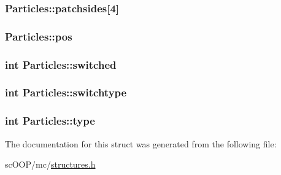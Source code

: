\hypertarget{struct_particles_a4ecd830800713531cca99b03e24bc502}{
\subsubsection[{patchsides}]{ Particles\+::patchsides\mbox{[}4\mbox{]}}}\label{struct_particles_a4ecd830800713531cca99b03e24bc502}
\hypertarget{struct_particles_a9766a2b5f21ece955b68fc2e7fe00574}{
\subsubsection[{pos}]{ Particles\+::pos}}\label{struct_particles_a9766a2b5f21ece955b68fc2e7fe00574}
\hypertarget{struct_particles_a1cdb653ca0fa7ac2e6887a1a0ddb613a}{
\subsubsection[{switched}]{\setlength{\rightskip}{0pt plus 5cm}int Particles\+::switched}}\label{struct_particles_a1cdb653ca0fa7ac2e6887a1a0ddb613a}
\hypertarget{struct_particles_a5465ea20678db4bf11787294f9a82059}{
\subsubsection[{switchtype}]{\setlength{\rightskip}{0pt plus 5cm}int Particles\+::switchtype}}\label{struct_particles_a5465ea20678db4bf11787294f9a82059}
\hypertarget{struct_particles_ac148492e8e5c31f3ebb5afb1133292fc}{
\subsubsection[{type}]{\setlength{\rightskip}{0pt plus 5cm}int Particles\+::type}}\label{struct_particles_ac148492e8e5c31f3ebb5afb1133292fc}


The documentation for this struct was generated from the following file\+:\begin{DoxyCompactItemize}
\item 
sc\+O\+O\+P/mc/\hyperlink{structures_8h}{structures.\+h}\end{DoxyCompactItemize}
